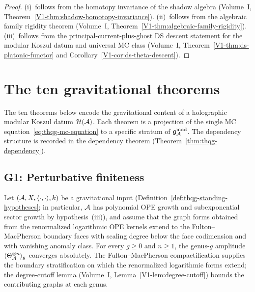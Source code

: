 \begin{proof}
(i)~follows from the homotopy invariance of the shadow algebra
(Volume~I, Theorem~\ref{V1-thm:shadow-homotopy-invariance}).
(ii)~follows from the algebraic family rigidity theorem
(Volume~I, Theorem~\ref{V1-thm:algebraic-family-rigidity}).
(iii)~follows from the principal-current-plus-ghost DS descent
statement for the modular Koszul datum and universal MC class
(Volume~I, Theorem~\ref{V1-thm:ds-platonic-functor} and
Corollary~\ref{V1-cor:ds-theta-descent}).
\end{proof}


%
%

\section{The ten gravitational theorems}

The ten theorems below encode the gravitational content of a holographic
modular Koszul datum $\mathcal{H}(\mathcal{A})$. Each theorem is a projection
of the single MC equation~\eqref{eq:thqg-mc-equation} to a specific
stratum of $\mathfrak{g}_{\mathcal{A}}^{\mathrm{mod}}$. The dependency structure is recorded in the
dependency theorem (Theorem~\ref{thm:thqg-dependency}).

\subsection{G1: Perturbative finiteness}

\begin{theorem}
Let $(\mathcal{A}, X, \langle\cdot,\cdot\rangle, k)$ be a gravitational input
(Definition~\ref{def:thqg-standing-hypotheses}; in particular,
$\mathcal{A}$ has polynomial OPE growth and subexponential sector growth
by hypothesis~\textup{(iii)}), and assume that the graph forms
obtained from the renormalized logarithmic OPE kernels extend to the
Fulton--MacPherson boundary faces with scaling degree below the face
codimension and with vanishing anomaly class.
For every $g \ge 0$ and $n \ge 1$, the genus-$g$ amplitude
$\langle \Theta_{\mathcal{A}}^{\otimes n} \rangle_g$ converges absolutely.
The Fulton--MacPherson compactification supplies the boundary
stratification on which the renormalized logarithmic forms extend; the
degree-cutoff lemma (Volume~I, Lemma~\ref{V1-lem:degree-cutoff}) bounds
the contributing graphs at each genus.
\end{theorem}

